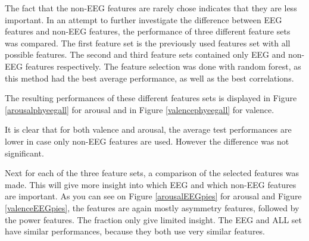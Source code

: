 The fact that the non-EEG features are rarely chose indicates that they are less important. In an attempt to further investigate the difference between EEG features and non-EEG features, the performance of three different feature sets was compared. The first feature set is the previously used features set with all possible features. The second and third feature sets contained only EEG and non-EEG features respectively. The feature selection was done with random forest, as this method had the best average performance, as well as the best correlations. 

\npar

The resulting performances of these different features sets is displayed in Figure \ref{arousalphyeegall} for arousal and in Figure \ref{valencephyeegall} for valence.



It is clear that for both valence and arousal, the average test performances are lower in case only non-EEG features are used. However the difference was not significant. %

\npar 

Next for each of the three feature sets, a comparison of the selected features was made. This will give more insight into which EEG and which non-EEG features are important. As you can see on Figure \ref{arousalEEGpies} for arousal and Figure \ref{valenceEEGpies}, the features are again mostly asymmetry features, followed by the power features. The fraction only give limited insight. The EEG and ALL set have similar performances, because they both use very similar features.

